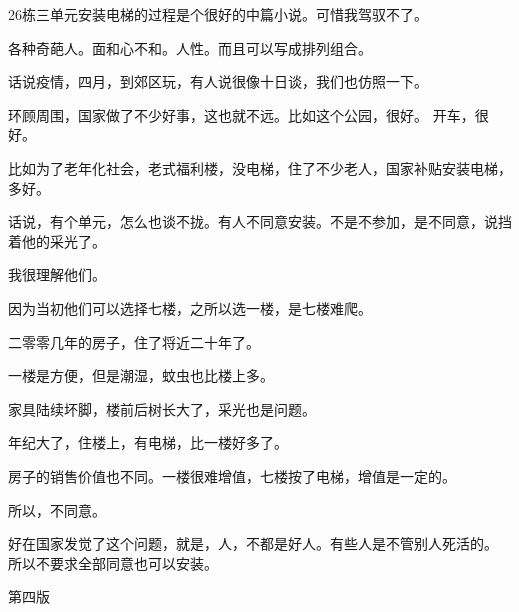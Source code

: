 \documentclass{article}   %
\begin{document}
26栋三单元安装电梯的过程是个很好的中篇小说。可惜我驾驭不了。
	
各种奇葩人。面和心不和。人性。而且可以写成排列组合。

话说疫情，四月，到郊区玩，有人说很像十日谈，我们也仿照一下。

环顾周围，国家做了不少好事，这也就不远。比如这个公园，很好。
开车，很好。

比如为了老年化社会，老式福利楼，没电梯，住了不少老人，国家补贴安装电梯，多好。

话说，有个单元，怎么也谈不拢。有人不同意安装。不是不参加，是不同意，说挡着他的采光了。

我很理解他们。

因为当初他们可以选择七楼，之所以选一楼，是七楼难爬。

二零零几年的房子，住了将近二十年了。

一楼是方便，但是潮湿，蚊虫也比楼上多。

家具陆续坏脚，楼前后树长大了，采光也是问题。

年纪大了，住楼上，有电梯，比一楼好多了。

房子的销售价值也不同。一楼很难增值，七楼按了电梯，增值是一定的。

所以，不同意。

好在国家发觉了这个问题，就是，人，不都是好人。有些人是不管别人死活的。
所以不要求全部同意也可以安装。

第四版
\end{document}
